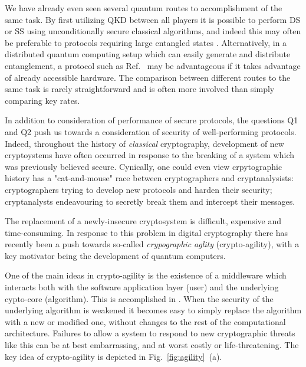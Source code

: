 We have already even seen several quantum routes to accomplishment of the same task. By first utilizing QKD between all players it is possible to perform DS  or SS  using unconditionally secure classical algorithms, and indeed this may often be preferable to protocols requiring large entangled states . Alternatively, in a distributed quantum computing setup which can easily generate and distribute entanglement, a protocol such as Ref.~ may be advantageous if it takes advantage of already accessible hardware. The comparison between different routes to the same task is rarely straightforward and is often more involved than simply comparing key rates.

In addition to consideration of performance of secure protocols, the questions Q1 and Q2 push us towards a consideration of security of well-performing protocols. Indeed, throughout the history of \emph{classical} cryptography, development of new cryptoystems have often occurred in response to the breaking of a system which was previously believed secure. Cynically, one could even view crpytographic history has a "cat-and-mouse" race between cryptographers and cryptanalysists: cryptographers trying to develop new protocols and harden their security; cryptanalysts endeavouring to secretly break them and intercept their messages. 

The replacement of a newly-insecure cryptosystem is difficult, expensive and time-consuming. In response to this problem in digital cryptography there has recently been a push towards so-called \emph{crypographic aglity} (crypto-agility),  with a key motivator being the development of quantum computers.  

One of the main ideas in crypto-agility is the existence of a middleware which interacts both with the software application layer (user) and the underlying cypto-core (algorithm). This is accomplished in . When the security of the underlying algorithm is weakened it becomes easy to simply replace the algorithm with a new or modified one, without changes to the rest of the computational architecture. Failures to allow a system to respond to new cryptographic threats like this can be at best embarrassing, and at worst costly or life-threatening.  The key idea of crypto-agility is depicted in Fig.~\ref{fig:agility}~(a).

